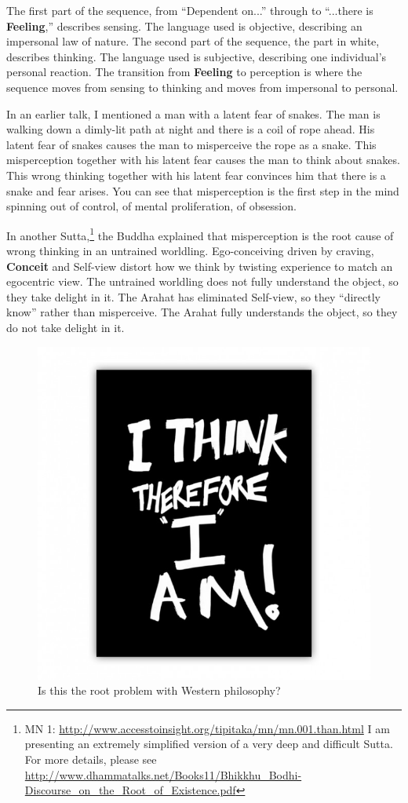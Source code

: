 The first part of the sequence, from “Dependent on...” through to “...there is \textbf{Feeling},” describes sensing. The language used is objective, describing an impersonal law of nature. The second part of the sequence, the part in white, describes thinking. The language used is subjective, describing one individual’s personal reaction. The transition from \textbf{Feeling} to perception is where the sequence moves from sensing to thinking and moves from impersonal to personal.

In an earlier talk, I mentioned a man with a latent fear of snakes. The man is walking down a dimly-lit path at night and there is a coil of rope ahead. His latent fear of snakes causes the man to misperceive the rope as a snake. This misperception together with his latent fear causes the man to think about snakes. This wrong thinking together with his latent fear convinces him that there is a snake and fear arises. You can see that misperception is the first step in the mind spinning out of control, of mental proliferation, of obsession.

In another Sutta,\footnote{MN 1: \url{http://www.accesstoinsight.org/tipitaka/mn/mn.001.than.html} I am presenting an extremely simplified version of a very deep and difficult Sutta. For more details, please see \url{http://www.dhammatalks.net/Books11/Bhikkhu_Bodhi-Discourse_on_the_Root_of_Existence.pdf}} the Buddha explained that misperception is the root cause of wrong thinking in an untrained worldling. Ego-conceiving driven by craving, \textbf{Conceit} and Self-view distort how we think by twisting experience to match an egocentric view. The untrained worldling does not fully understand the object, so they take delight in it. The Arahat has eliminated Self-view, so they “directly know” rather than misperceive. The Arahat fully understands the object, so they do not take delight in it.

\begin{figure}[h]
\centering
\includegraphics[width=0.3\linewidth]{./Diagrams/Think}
\caption{Is this the root problem with Western philosophy?}
\label{fig:Think}
\end{figure}

